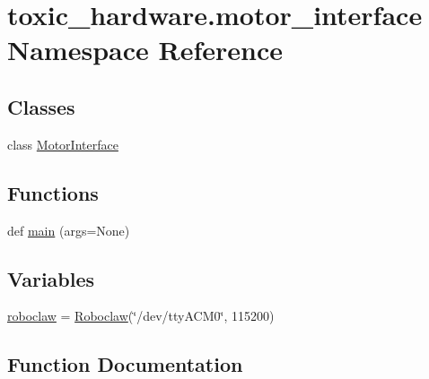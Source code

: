\hypertarget{namespacetoxic__hardware_1_1motor__interface}{}\section{toxic\+\_\+hardware.\+motor\+\_\+interface Namespace Reference}
\label{namespacetoxic__hardware_1_1motor__interface}
\subsection*{Classes}
\begin{DoxyCompactItemize}
\item 
class \mbox{\hyperlink{classtoxic__hardware_1_1motor__interface_1_1MotorInterface}{Motor\+Interface}}
\end{DoxyCompactItemize}
\subsection*{Functions}
\begin{DoxyCompactItemize}
\item 
def \mbox{\hyperlink{namespacetoxic__hardware_1_1motor__interface_a2a214c16e0dd6e2551c72185d306001e}{main}} (args=None)
\end{DoxyCompactItemize}
\subsection*{Variables}
\begin{DoxyCompactItemize}
\item 
\mbox{\hyperlink{namespacetoxic__hardware_1_1motor__interface_a16c7b96fda2822af1075c24bec28e128}{roboclaw}} = \mbox{\hyperlink{classtoxic__hardware_1_1roboclaw__3_1_1Roboclaw}{Roboclaw}}(\char`\"{}/dev/tty\+A\+C\+M0\char`\"{}, 115200)
\end{DoxyCompactItemize}


\subsection{Function Documentation}
\mbox{\label{namespacetoxic__hardware_1_1motor__interface_a2a214c16e0dd6e2551c72185d306001e}} 
